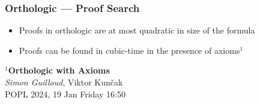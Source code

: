 \documentclass[
    aspectratio=169,
    xcolor={dvipsnames},
]{beamer}
\begin{document}
\begin{frame}
    \frametitle{Orthologic --- Proof Search}



    \begin{itemize}
        \item Proofs in orthologic are at most quadratic in size of the formula
        \item Proofs can be found in cubic-time in the presence of axioms\(^1\)
    \end{itemize}


    \vspace{1em}
    \begin{center}
        \(^1\)\textbf{Orthologic with Axioms} \\
        \emph{Simon Guilloud}, Viktor Kun\v cak\\
        POPL 2024, 19 Jan Friday 16:50
    \end{center}


\end{frame}

\end{document}
